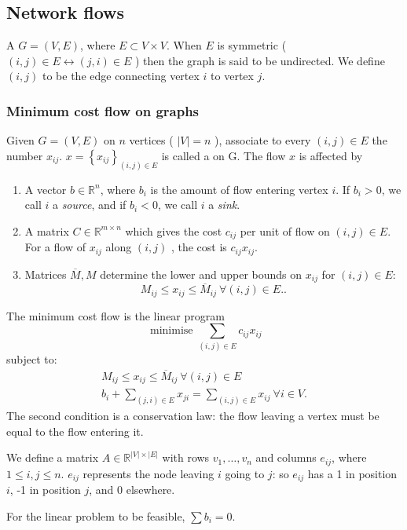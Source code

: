 \documentclass[a4paper]{scrartcl}
\begin{document}
\subsection{Network flows}
\begin{definition}[Graph]
	 A  $G=(V,E)$, where $E \subset V \times V$. When $E$ is symmetric ( $(i,j) \in E \leftrightarrow (j,i) \in E$ ) then the graph is said to be undirected. We define $(i,j)$ to be the edge connecting vertex $i$ to vertex $j$.
\end{definition}
\subsubsection{Minimum cost flow on graphs}
Given $G=(V,E)$ on $n$ vertices ( $|V|=n$ ), associate to every $(i,j) \in E$ the number $x_{ij}$. $x=\left\{x_{ij}\right\}_{(i,j)\in E}$ is called a  on G. The flow $x$ is affected by 
\begin{enumerate}
	\item A vector $b \in \mathbb{R}^{n} $, where $b_i$ is the amount of flow entering vertex $i$. If $b_i >0$, we call $i$ a \emph{source}, and if $b_i <0$, we call $i$ a \emph{sink}. 
	\item A matrix $C \in \mathbb{R}^{m \times n} $ which gives the cost $c_{ij}$ per unit of flow on $(i,j) \in E$. For a flow of $x_{ij}$ along $(i,j)$ , the cost is $c_{ij}x_{ij}$. 
	\item Matrices $\overline{M} ,M$ determine the lower and upper bounds on $x_{ij}$ for $(i,j) \in E$: \[
	M_{ij} \leq x_{ij} \leq \overline{M}_{ij} \ \forall (i,j) \in E.
	.\]  
\end{enumerate}  
\begin{definition}
	 The minimum cost flow is the linear program \[
	 \text{ minimise } \sum_{(i,j) \in E}c_{ij}x_{ij}
	 \] 
	 subject to: 
	 \begin{align*}
		M_{ij} \leq x_{ij} \leq \overline{M}_{ij} \ \forall (i,j) \in E\\
		b_i + \sum_{(j,i) \in E} x_{ji}=\sum_{(i,j) \in E}^{}x_{ij} \ \forall i \in V. 
	 \end{align*}
	 The second condition is a conservation law: the flow leaving a vertex must be equal to the flow entering it.
\end{definition}
\begin{definition}
	 We define a matrix $A \in \mathbb{R}^{|V|\times |E|} $ with rows $v_1 ,\ldots , v_n$ and columns $e_{ij}$, where $1 \leq i,j \leq n$. $e_{ij}$ represents the node leaving $i$ going to $j$: so $e_{ij}$ has a 1 in position $i$, -1 in position $j$, and $0$ elsewhere. 
\end{definition}
\begin{remark}
	 For the linear problem to be feasible, $\sum b_i =0$.
\end{remark}
\end{document}
